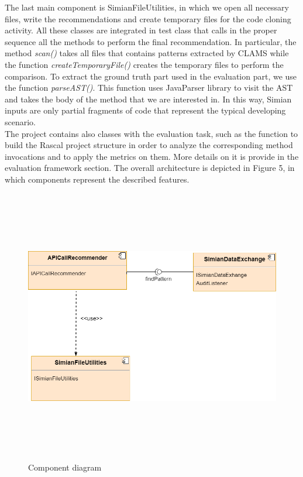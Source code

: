 The last main component is SimianFileUtilities, in which we open all necessary files, write the recommendations and create temporary files for the code cloning activity. All these classes are integrated in test class that calls in the proper sequence all the methods to perform the final recommendation. In particular, the method \textit{scan()} takes all files that contains patterns extracted by CLAMS while the function \textit{createTemporaryFile()} creates the temporary files to perform the comparison. To extract the ground truth part used in the evaluation part, we use the function \textit{parseAST()}. This function uses JavaParser library to visit the AST and takes the body of the method that we are interested in. In this way, Simian inputs are only partial fragments of code that represent the typical developing scenario. \\
The project contains also classes with the evaluation task, such as the function to build the Rascal project structure in order to analyze the corresponding method invocations and to apply the metrics on them. More details on it is provide in the evaluation framework section. 
The overall architecture is depicted in Figure 5, in which components represent the described features.
\begin{figure}[H]
\includegraphics[width=12cm,height=12cm,keepaspectratio]{images/Component.png}
\centering
\caption{Component diagram}
\label{fig:cmd}
\end{figure}

